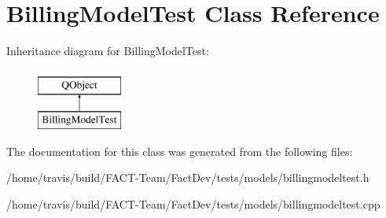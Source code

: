 \hypertarget{classBillingModelTest}{\section{Billing\-Model\-Test Class Reference}
\label{classBillingModelTest}
}
Inheritance diagram for Billing\-Model\-Test\-:\begin{figure}[H]
\begin{center}
\leavevmode
\includegraphics[height=2.000000cm]{dc/d0c/classBillingModelTest}
\end{center}
\end{figure}


The documentation for this class was generated from the following files\-:\begin{DoxyCompactItemize}
\item 
/home/travis/build/\-F\-A\-C\-T-\/\-Team/\-Fact\-Dev/tests/models/billingmodeltest.\-h\item 
/home/travis/build/\-F\-A\-C\-T-\/\-Team/\-Fact\-Dev/tests/models/billingmodeltest.\-cpp\end{DoxyCompactItemize}
